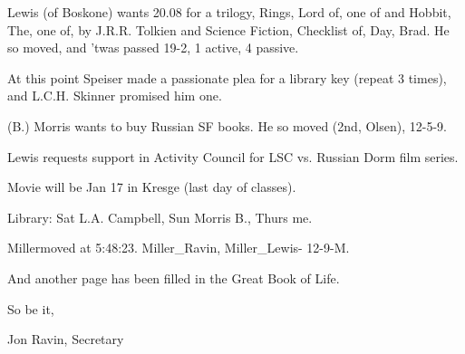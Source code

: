 \documentclass[12pt]{article}
\begin{document}
Lewis (of Boskone) wants 20.08 for a trilogy, Rings, Lord of, one of and Hobbit, The, one of, by J.R.R. Tolkien and Science Fiction, Checklist of, Day, Brad. He so moved, and 'twas passed 19-2, 1 active, 4 passive.

At this point Speiser made a passionate plea for a library key (repeat 3 times), and L.C.H. Skinner promised him one.

(B.) Morris wants to buy Russian SF books. He so moved (2nd, Olsen), 12-5-9.

Lewis requests support in Activity Council for LSC vs. Russian Dorm film series.

Movie will be Jan 17 in Kresge (last day of classes).

Library: Sat L.A. Campbell, Sun Morris B., Thurs me.

Millermoved at 5:48:23. Miller_Ravin, Miller_Lewis- 12-9-M.

And another page has been filled in the Great Book of Life.

\vspace{12pt}

\centerline{So be it,}
\centerline{Jon Ravin, Secretary}
\end{document}
